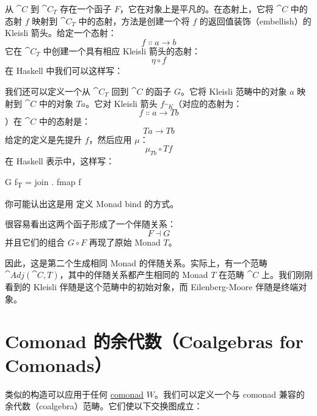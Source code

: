从 $\cat{C}$ 到 $\cat{C}_T$ 存在一个函子 $F$，它在对象上是平凡的。在态射上，它将 $\cat{C}$ 中的态射 $f$ 映射到 $\cat{C}_T$ 中的态射，方法是创建一个将 $f$ 的返回值装饰（embellish）的 Kleisli 箭头。给定一个态射：
\[f \Colon a \to b\]
它在 $\cat{C}_T$ 中创建一个具有相应 Kleisli 箭头的态射：
\[\eta \circ f\]
在 Haskell 中我们可以这样写：

我们还可以定义一个从 $\cat{C}_T$ 回到 $\cat{C}$ 的函子 $G$。它将 Kleisli 范畴中的对象 $a$ 映射到 $\cat{C}$ 中的对象 $T a$。它对 Kleisli 箭头 $f_{\cat{K}}$（对应的态射为：
\[f \Colon a \to T b\]
）在 $\cat{C}$ 中的态射是：
\[T a \to T b\]
给定的定义是先提升 $f$，然后应用 $\mu$：
\[\mu_{T b} \circ T f\]
在 Haskell 表示中，这样写：

\begin{snipv}
  G f\textsubscript{T} = join . fmap f
\end{snipv}
你可能认出这是用  定义 Monad bind 的方式。

很容易看出这两个函子形成了一个伴随关系：
\[F \dashv G\]
并且它们的组合 $G \circ F$ 再现了原始 Monad $T$。

因此，这是第二个生成相同 Monad 的伴随关系。实际上，有一个范畴 $\cat{Adj}(\cat{C}, T)$，其中的伴随关系都产生相同的 Monad $T$ 在范畴 $\cat{C}$ 上。我们刚刚看到的 Kleisli 伴随是这个范畴中的初始对象，而 Eilenberg-Moore 伴随是终端对象。

\section{Comonad 的余代数（Coalgebras for Comonads）}

类似的构造可以应用于任何 \hyperref[comonads]{comonad} $W$。我们可以定义一个与 comonad 兼容的余代数（coalgebra）范畴。它们使以下交换图成立：

\begin{figure}[H]
  \centering
  \begin{subfigure}
    \centering
  \end{subfigure}%
  \hspace{1cm}
  \begin{subfigure}
    \centering
  \end{subfigure}
\end{figure}

